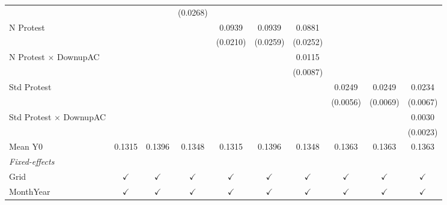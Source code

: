\begin{table}[htbp]
\begin{tabular}{lccccccccc}
                                      &               &               & (0.0268)      &               &               &               &               &               &   \\   
      N Protest                       &               &               &               & 0.0939        & 0.0939        & 0.0881        &               &               &   \\   
                                      &               &               &               & (0.0210)      & (0.0259)      & (0.0252)      &               &               &   \\   
      N Protest $\times$ DownupAC     &               &               &               &               &               & 0.0115        &               &               &   \\   
                                      &               &               &               &               &               & (0.0087)      &               &               &   \\   
      Std Protest                     &               &               &               &               &               &               & 0.0249        & 0.0249        & 0.0234\\   
                                      &               &               &               &               &               &               & (0.0056)      & (0.0069)      & (0.0067)\\   
      Std Protest $\times$ DownupAC   &               &               &               &               &               &               &               &               & 0.0030\\   
                                      &               &               &               &               &               &               &               &               & (0.0023)\\   
      Mean Y0                         & 0.1315        & 0.1396        & 0.1348        & 0.1315        & 0.1396        & 0.1348        & 0.1363        & 0.1363        & 0.1363\\  
      \midrule
      \emph{Fixed-effects}\\
      Grid                            & $\checkmark$  & $\checkmark$  & $\checkmark$  & $\checkmark$  & $\checkmark$  & $\checkmark$  & $\checkmark$  & $\checkmark$  & $\checkmark$\\   
      MonthYear                       & $\checkmark$  & $\checkmark$  & $\checkmark$  & $\checkmark$  & $\checkmark$  & $\checkmark$  & $\checkmark$  & $\checkmark$  & $\checkmark$\\   

\end{tabular}
\end{table}
